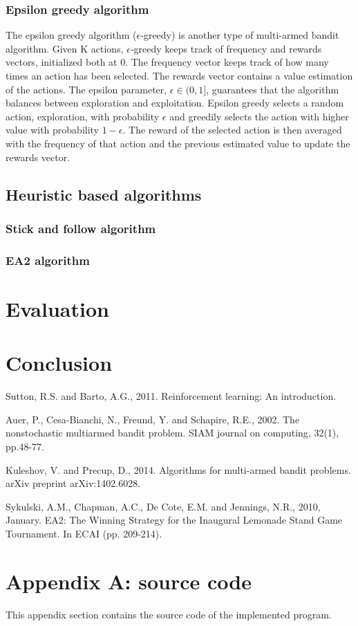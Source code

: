 \documentclass[runningheads]{llncs}
\begin{document}
\subsubsection{Epsilon greedy algorithm}
The epsilon greedy algorithm ($\epsilon$-greedy) is another type of
multi-armed bandit algorithm. Given K actions, $\epsilon$-greedy keeps
track of frequency and rewards vectors, initialized both at 0. The
frequency vector keeps track of how many times an action has been
selected. The rewards vector contains a value estimation of the
actions. The epsilon parameter, $\epsilon \in (0, 1]$, guarantees that
the algorithm balances between exploration and exploitation. Epsilon
greedy selects a random action, exploration, with probability
$\epsilon$ and greedily selects the action with higher value with
probability $1 - \epsilon$. The reward of the selected action is then
averaged with the frequency of that action and the previous estimated
value to update the rewards vector.


\subsection{Heuristic based algorithms}
\subsubsection{Stick and follow algorithm}
\subsubsection{EA2 algorithm}


\section{Evaluation}

\section{Conclusion}

\begin{thebibliography}{8}

Sutton, R.S. and Barto, A.G., 2011. Reinforcement learning: An
introduction.

Auer, P., Cesa-Bianchi, N., Freund, Y. and Schapire, R.E., 2002. The
nonstochastic multiarmed bandit problem. SIAM journal on computing,
32(1), pp.48-77.

Kuleshov, V. and Precup, D., 2014. Algorithms for multi-armed bandit
problems. arXiv preprint arXiv:1402.6028.

Sykulski, A.M., Chapman, A.C., De Cote, E.M. and Jennings, N.R., 2010,
January. EA2: The Winning Strategy for the Inaugural Lemonade Stand
Game Tournament. In ECAI (pp. 209-214).
  
\end{thebibliography}

\section{Appendix A: source code}\label{appendix}
This appendix section contains the source code of the implemented program.

\end{document}
